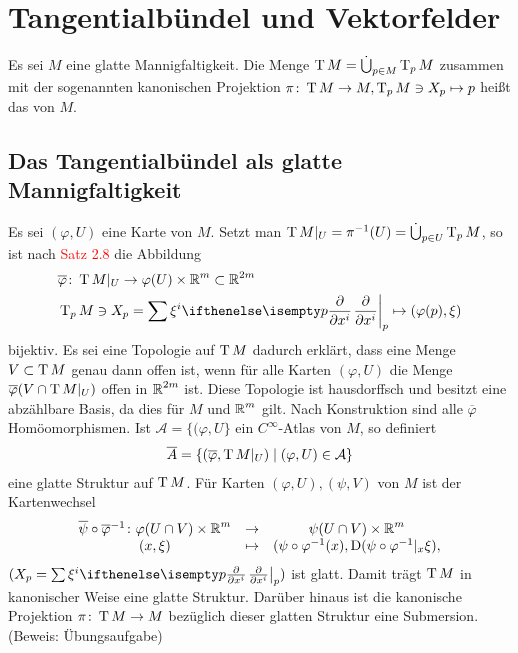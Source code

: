 
\chapter{Tangentialbündel und Vektorfelder}

\begin{Dfn}[Tangentialbündel]
  Es sei $M$ eine glatte Mannigfaltigkeit. Die Menge $\operatorname{T} M = \dot \bigcup_{p \in M}\operatorname{T}_pM$ zusammen mit der sogenannten kanonischen Projektion $\pi \colon \operatorname{T} M \to M, \operatorname{T}_pM \ni X_p \mapsto p$ heißt das  von $M$.
\end{Dfn}

\section{Das Tangentialbündel als glatte Mannigfaltigkeit}

Es sei $(\varphi, U)$ eine Karte von $M$. Setzt man $\operatorname{T} M|_U = \pi^{-1}(U) = \dot \bigcup_{p\in U}\operatorname{T}_pM$, so ist nach \textcolor{red}{Satz 2.8} %
die Abbildung
\begin{align*}
  & \overline \varphi \colon \T M|_U \to \varphi(U) \times \R^m \subset \R^{2m}\\
  &\T_p M \ni X_p = \sum \xi^i\pdifffrac[p]{}{x^i} \mapsto (\varphi(p),\xi)
\end{align*}
bijektiv.
Es sei eine Topologie auf $\operatorname{T} M$ dadurch erklärt, dass eine Menge $V \subset \operatorname{T} M$ genau dann offen ist, wenn für alle Karten $(\varphi, U)$ die Menge $\overline \varphi(V \cap \operatorname{T} M|_U)$ offen in $\operatorname{\mathbb{R}}^{2m}$ ist. Diese Topologie ist hausdorffsch und besitzt eine abzählbare Basis, da dies für $M$ und $\operatorname{\mathbb{R}}^m$ gilt. Nach Konstruktion sind alle $\overline \varphi$ Homöomorphismen. Ist $\mathcal A = \{(\varphi, U\}$ ein $C^{\infty}$-Atlas von $M$, so definiert
\begin{align*}
  \overline A = \{(\overline \varphi, \operatorname{T} M|_U) \mid (\varphi, U) \in \mathcal A\}
\end{align*}
eine glatte Struktur auf $\operatorname{T} M$. Für Karten $(\varphi, U), (\psi, V)$ von $M$ ist der Kartenwechsel
\[\begin{array}{ccc}
  \overline \psi \circ \overline \varphi^{-1} \colon \varphi(U \cap V) \times \operatorname{\mathbb{R}}^m &\to& \psi(U \cap V) \times \operatorname{\mathbb{R}}^m \\
  (x, \xi) &\mapsto& (\psi \circ \varphi^{-1}(x),\operatorname{D}(\psi \circ \varphi^{-1}|_x\xi),
\end{array}\]
$(X_p = \sum \xi^i \pdifffrac[p]{}{x^i})$ ist glatt. Damit trägt $\operatorname{T} M$ in kanonischer Weise eine glatte Struktur.
Darüber hinaus ist die kanonische Projektion $\pi \colon \operatorname{T} M \to M$ bezüglich dieser glatten Struktur eine Submersion. (Beweis: Übungsaufgabe)

